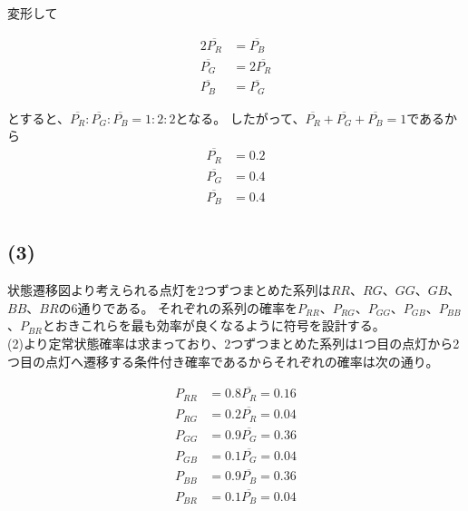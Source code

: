 \documentclass[a4paper,12pt,xelatex,ja=standard]{bxjsarticle}
\begin{document}
変形して

\begin{equation*}
  \begin{split}
    2\overline{P_R} &= \overline{P_B} \\
    \overline{P_G} &= 2 \overline{P_R} \\
    \overline{P_B} &= \overline{P_G}
  \end{split}
\end{equation*}

とすると、$\overline{P_R} : \overline{P_G} : \overline{P_B} = 1 : 2 : 2$となる。
したがって、$\overline{P_R} + \overline{P_G} + \overline{P_B} = 1$であるから
\begin{equation*}
  \begin{split}
    \overline{P_R} &= 0.2 \\
    \overline{P_G} &= 0.4 \\
    \overline{P_B} &= 0.4 \\
  \end{split}
\end{equation*}

\subsection*{(3)}

状態遷移図より考えられる点灯を2つずつまとめた系列は$RR$、$RG$、$GG$、$GB$、$BB$、$BR$の6通りである。
それぞれの系列の確率を$P_{RR}$、$P_{RG}$、$P_{GG}$、$P_{GB}$、$P_{BB}$、$P_{BR}$とおきこれらを最も効率が良くなるように符号を設計する。\\

(2)より定常状態確率は求まっており、2つずつまとめた系列は1つ目の点灯から2つ目の点灯へ遷移する条件付き確率であるからそれぞれの確率は次の通り。

\begin{equation*}
  \begin{split}
    P_{RR} &= 0.8 \overline{P_R} = 0.16 \\
    P_{RG} &= 0.2 \overline{P_R} = 0.04 \\
    P_{GG} &= 0.9 \overline{P_G} = 0.36 \\
    P_{GB} &= 0.1 \overline{P_G} = 0.04 \\
    P_{BB} &= 0.9 \overline{P_B} = 0.36 \\
    P_{BR} &= 0.1 \overline{P_B} = 0.04 \\
  \end{split}
\end{equation*}
\end{document}
